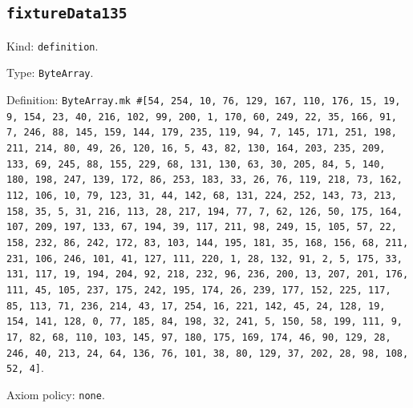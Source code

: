\documentclass[11pt]{article}
\begin{document}
\subsection*{\texttt{fixtureData135}}
\noindent Kind: \texttt{definition}.\par
\noindent Type: \texttt{ByteArray}.\par
\noindent Definition: \texttt{ByteArray.mk \#[54, 254, 10, 76, 129, 167, 110, 176, 15, 19, 9, 154, 23, 40, 216, 102, 99, 200, 1, 170, 60, 249, 22, 35, 166, 91, 7, 246, 88, 145, 159, 144, 179, 235, 119, 94, 7, 145, 171, 251, 198, 211, 214, 80, 49, 26, 120, 16, 5, 43, 82, 130, 164, 203, 235, 209, 133, 69, 245, 88, 155, 229, 68, 131, 130, 63, 30, 205, 84, 5, 140, 180, 198, 247, 139, 172, 86, 253, 183, 33, 26, 76, 119, 218, 73, 162, 112, 106, 10, 79, 123, 31, 44, 142, 68, 131, 224, 252, 143, 73, 213, 158, 35, 5, 31, 216, 113, 28, 217, 194, 77, 7, 62, 126, 50, 175, 164, 107, 209, 197, 133, 67, 194, 39, 117, 211, 98, 249, 15, 105, 57, 22, 158, 232, 86, 242, 172, 83, 103, 144, 195, 181, 35, 168, 156, 68, 211, 231, 106, 246, 101, 41, 127, 111, 220, 1, 28, 132, 91, 2, 5, 175, 33, 131, 117, 19, 194, 204, 92, 218, 232, 96, 236, 200, 13, 207, 201, 176, 111, 45, 105, 237, 175, 242, 195, 174, 26, 239, 177, 152, 225, 117, 85, 113, 71, 236, 214, 43, 17, 254, 16, 221, 142, 45, 24, 128, 19, 154, 141, 128, 0, 77, 185, 84, 198, 32, 241, 5, 150, 58, 199, 111, 9, 17, 82, 68, 110, 103, 145, 97, 180, 175, 169, 174, 46, 90, 129, 28, 246, 40, 213, 24, 64, 136, 76, 101, 38, 80, 129, 37, 202, 28, 98, 108, 52, 4]}.\par
\noindent Axiom policy: \texttt{none}.\par
\end{document}
